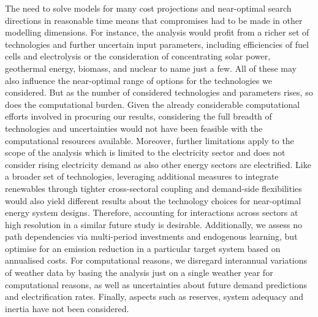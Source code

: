 The need to solve models for many cost projections and near-optimal search
directions in reasonable time means that compromises had to be made in other
modelling dimensions. For instance, the analysis would profit from a richer set
of technologies and further uncertain input parameters, including efficiencies
of fuel cells and electrolysis or the consideration of concentrating solar
power, geothermal energy, biomass, and nuclear to name just a few. All of these
may also influence the near-optimal range of options for the technologies we
considered. But as the number of considered technologies and parameters rises,
so does the computational burden. Given the already considerable computational
efforts involved in procuring our results, considering the full breadth of
technologies and uncertainties would not have been feasible with the
computational resources available. Moreover, further limitations apply to the
scope of the analysis which is limited to the electricity sector and does not
consider rising electricity demand as also other energy sectors are electrified.
Like a broader set of technologies, leveraging additional measures to integrate
renewables through tighter cross-sectoral coupling and demand-side flexibilities
would also yield different results about the technology choices for near-optimal
energy system designs. Therefore, accounting for interactions across sectors at
high resolution in a similar future study is desirable. Additionally, we assess
no path dependencies via multi-period investments and endogenous learning, but
optimise for an emission reduction in a particular target system based on
annualised costs. For computational reasons, we disregard interannual
variations of weather data by basing the analysis just on a single weather year
for computational reasons, as well as uncertainties about future demand
predictions and electrification rates. Finally, aspects such as reserves, system
adequacy and inertia have not been considered.
